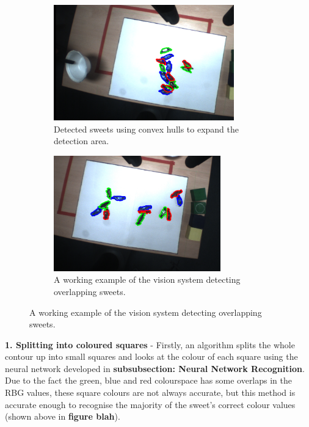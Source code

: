 \begin{figure}[ht!]
    \captionsetup[subfigure]{justification=centering}
    \begin{subfigure}[H]{0.475\textwidth}   
        \centering 
        \includegraphics[width=\textwidth, height=5cm]{convexhulloverlappissues.png}
        \caption{Detected sweets using convex hulls to expand the detection area.}
        \label{fig:TimeGrasp}
    \end{subfigure}
    \begin{subfigure}[H]{0.475\textwidth}   
        \centering 
        \includegraphics[width=\textwidth, height=5cm]{collisioncorrectdetection.png}
        \caption{A working example of the vision system detecting overlapping sweets.}
        \label{fig:TimeGrasp}
    \end{subfigure}
\end{figure}
\newline\newline
\textbf{1. Splitting into coloured squares} - Firstly, an algorithm splits the whole contour up into small squares and looks at the colour of each square using the neural network developed in \textbf{subsubsection: Neural Network Recognition}. Due to the fact the green, blue and red colourspace has some overlaps in the RBG values, these square colours are not always accurate, but this method is accurate enough to recognise the majority of the sweet's correct colour values (shown above in \textbf{figure blah}).
\newline\newline

